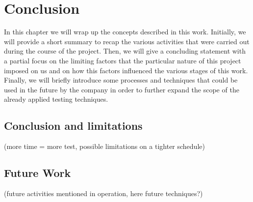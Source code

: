 \chapter{Conclusion}

In this chapter we will wrap up the concepts described in this work. Initially, we will provide a short summary to recap the various activities that were carried out during the course of the project. Then, we will give a concluding statement with a partial focus on the limiting factors that the particular nature of this project imposed on us and on how this factors influenced the various stages of this work. Finally, we will briefly introduce some processes and techniques that could be used in the future by the company in order to further expand the scope of the already applied testing techniques.

\section{Conclusion and limitations} 

(more time = more test, possible limitations on a tighter schedule)

\section{Future Work} 

(future activities mentioned in operation, here future techniques?)